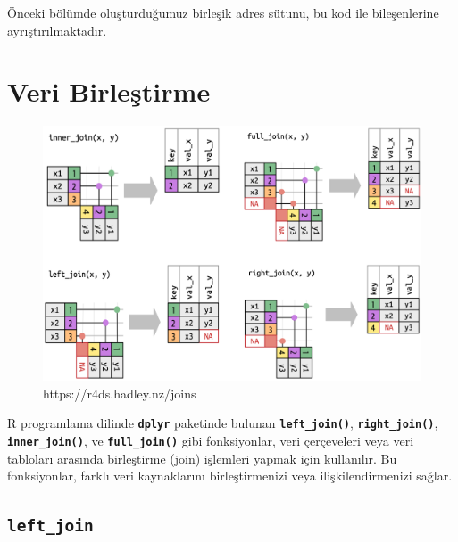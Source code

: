 \documentclass[
  letterpaper,
  DIV=11,
  numbers=noendperiod]{scrreprt}
\begin{document}
Önceki bölümde oluşturduğumuz birleşik adres sütunu, bu kod ile
bileşenlerine ayrıştırılmaktadır.


\chapter*{Veri Birleştirme}\label{part-datajoin}


\begin{figure}[H]

{\centering \includegraphics{images/joins.png}

}

\caption{https://r4ds.hadley.nz/joins}

\end{figure}%

R programlama dilinde \textbf{\texttt{dplyr}} paketinde bulunan
\textbf{\texttt{left\_join()}}, \textbf{\texttt{right\_join()}},
\textbf{\texttt{inner\_join()}}, ve \textbf{\texttt{full\_join()}} gibi
fonksiyonlar, veri çerçeveleri veya veri tabloları arasında birleştirme
(join) işlemleri yapmak için kullanılır. Bu fonksiyonlar, farklı veri
kaynaklarını birleştirmenizi veya ilişkilendirmenizi sağlar.

\section*{\texorpdfstring{\texttt{left\_join}}{left\_join}}\label{left_join}
\end{document}

